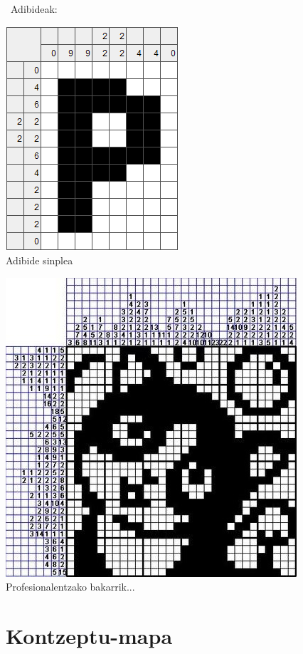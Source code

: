 \documentclass[dvipsnames]{AritzhClass}
\begin{document}
\
Adibideak:

\begin{center}
\includegraphics[scale=0.5]{nonograma1} \\Adibide sinplea 
\end{center}
\begin{center}
\includegraphics[scale=0.5]{nonograma2} \\Profesionalentzako bakarrik...
\end{center}

\section{Kontzeptu-mapa}
\end{document}
